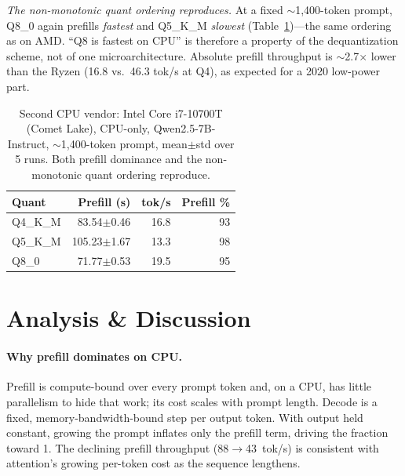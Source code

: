 \documentclass[10pt,twocolumn]{article}
\begin{document}
\emph{The non-monotonic quant ordering reproduces.} At a fixed
$\sim$1{,}400-token prompt, Q8\_0 again prefills \emph{fastest} and
Q5\_K\_M \emph{slowest} (Table~\ref{tab:intel})---the same ordering as on
AMD. ``Q8 is fastest on CPU'' is therefore a property of the dequantization
scheme, not of one microarchitecture. Absolute prefill throughput is
$\sim$2.7$\times$ lower than the Ryzen (16.8 vs.\ 46.3 tok/s at Q4), as
expected for a 2020 low-power part.

\begin{table}[t]
  \centering
  \caption{Second CPU vendor: Intel Core i7-10700T (Comet Lake), CPU-only,
  Qwen2.5-7B-Instruct, $\sim$1{,}400-token prompt, mean$\pm$std over 5 runs.
  Both prefill dominance and the non-monotonic quant ordering reproduce.}
  \label{tab:intel}
  \small
  \begin{tabular}{lrrr}
    \toprule
    Quant & Prefill (s) & tok/s & Prefill \% \\
    \midrule
    Q4\_K\_M & 83.54$\pm$0.46  & 16.8 & 93 \\
    Q5\_K\_M & 105.23$\pm$1.67 & 13.3 & 98 \\
    Q8\_0    & 71.77$\pm$0.53  & 19.5 & 95 \\
    \bottomrule
  \end{tabular}
\end{table}

\section{Analysis \& Discussion}
\label{sec:discussion}

\paragraph{Why prefill dominates on CPU.}
Prefill is compute-bound over every prompt token and, on a CPU, has little
parallelism to hide that work; its cost scales with prompt length. Decode
is a fixed, memory-bandwidth-bound step per output token. With output held
constant, growing the prompt inflates only the prefill term, driving the
fraction toward 1. The declining prefill throughput
(88$\rightarrow$43~tok/s) is consistent with attention's growing per-token
cost as the sequence lengthens.
\end{document}
